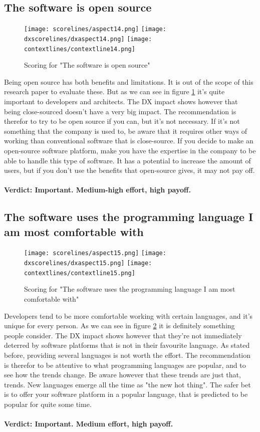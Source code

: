 \documentclass{cslthse-msc}
\begin{document}
    \subsection{The software is open source}
    \begin{figure}[H]
        \centering
        \texttt{[image: scorelines/aspect14.png]}
        \texttt{[image: dxscorelines/dxaspect14.png]}
        \texttt{[image: contextlines/contextline14.png]}
        \caption{Scoring for "The software is open source"}
        \label{fig:aspect14}
    \end{figure}
    Being open source has both benefits and limitations. It is out of the scope of this research paper to evaluate these. But as we can see in figure \ref{fig:aspect14} it's quite important to developers and architects. The DX impact shows however that being close-sourced doesn't have a very big impact. The recommendation is therefor to try to be open source if you can, but it's not necessary. If it's not something that the company is used to, be aware that it requires other ways of working than conventional software that is close-source. If you decide to make an open-source software platform, make you have the expertise in the company to be able to handle this type of software. It has a potential to increase the amount of users, but if you don't use the benefits that open-source gives, it may not pay off. \\ \\
    \textbf{Verdict: Important. Medium-high effort, high payoff.}

    \subsection{The software uses the programming language I am most comfortable with}
    \begin{figure}[H]
        \centering
        \texttt{[image: scorelines/aspect15.png]}
        \texttt{[image: dxscorelines/dxaspect15.png]}
        \texttt{[image: contextlines/contextline15.png]}
        \caption{Scoring for "The software uses the programming language I am most comfortable with"}
        \label{fig:aspect15}
    \end{figure}
    Developers tend to be more comfortable working with certain languages, and it's unique for every person. As we can see in figure \ref{fig:aspect15} it is definitely something people consider. The DX impact shows however that they're not immediately deterred by software platforms that is not in their favourite language. As stated before, providing several languages is not worth the effort. The recommendation is therefor to be attentive to what programming languages are popular, and to see how the trends change. Be aware however that these trends are just that, trends. New languages emerge all the time as "the new hot thing". The safer bet is to offer your software platform in a popular language, that is predicted to be popular for quite some time. \\ \\
    \textbf{Verdict: Important. Medium effort, high payoff.}
\end{document}
